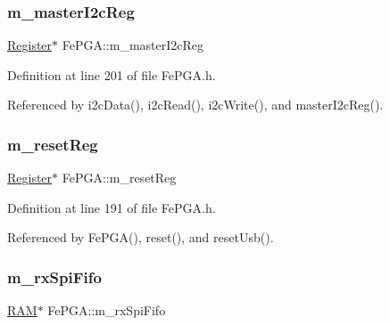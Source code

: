 \mbox{\label{classFePGA_adb390ea8de4a6cbce648dc62e4405f32}} 
\subsubsection{\texorpdfstring{m\+\_\+master\+I2c\+Reg}{m\_masterI2cReg}}
{\footnotesize\ttfamily \hyperlink{classRegister}{Register}$\ast$ Fe\+P\+G\+A\+::m\+\_\+master\+I2c\+Reg\hspace{0.3cm}{\ttfamily [private]}}



Definition at line 201 of file Fe\+P\+G\+A.\+h.



Referenced by i2c\+Data(), i2c\+Read(), i2c\+Write(), and master\+I2c\+Reg().

\mbox{\label{classFePGA_aeff1a2370237a06b50e1ae23d933c862}} 
\subsubsection{\texorpdfstring{m\+\_\+reset\+Reg}{m\_resetReg}}
{\footnotesize\ttfamily \hyperlink{classRegister}{Register}$\ast$ Fe\+P\+G\+A\+::m\+\_\+reset\+Reg\hspace{0.3cm}{\ttfamily [private]}}



Definition at line 191 of file Fe\+P\+G\+A.\+h.



Referenced by Fe\+P\+G\+A(), reset(), and reset\+Usb().

\mbox{\label{classFePGA_a3ee7f973bfad39b48bbc1a185e9ffaec}} 
\subsubsection{\texorpdfstring{m\+\_\+rx\+Spi\+Fifo}{m\_rxSpiFifo}}
{\footnotesize\ttfamily \hyperlink{classRAM}{R\+AM}$\ast$ Fe\+P\+G\+A\+::m\+\_\+rx\+Spi\+Fifo\hspace{0.3cm}{\ttfamily [private]}}



